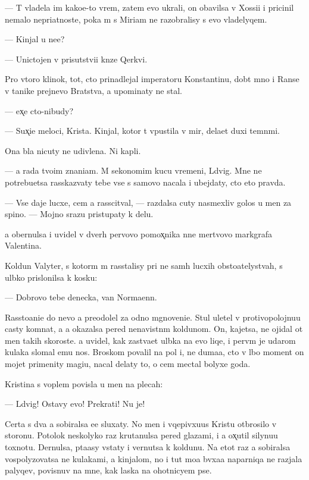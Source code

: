 \documentclass[10pt]{book}
\begin{document}
— T{\yi} vladela im kako{\y}e-to vrem{\ia}, zatem {\y}evo ukrali, on ob{\y}avilsa v Xossi{\y}i i pricinil nemalo nepri{\y}atnoste{\y}, poka m{\yi} s Miriam ne razobralisy s {\y}evo vladelyqem.

— Kinjal u ne{\y}e?

— Unictojen v prisutstvi{\y}i kn{\ia}ze{\y} Qerkvi.

Pro vtoro{\y} klinok, tot, cto prinadlejal imperatoru Konstantinu, dob{\yi}t{\yi}{\y} mno{\y} i Ranse v ta{\y}nike prejnevo Bratstva, {\y}a upominaty ne stal.

— {\Y}ex̨e cto-nibudy?

— Sux̨i{\y}e meloci, Krista. Kinjal, kotor{\yi}{\y} t{\yi} v{\yi}pustila v mir, dela{\y}et duxi temn{\yi}mi.

Ona b{\yi}la nicuty ne udivlena. Ni kapli.

— {\Y}a rada tvo{\y}im znani{\y}am. M{\yi} sekonomim kucu vremeni, L{\iu}dvig. Mne ne potrebu{\y}etsa rasskaz{\yi}vaty tebe vse s samovo nacala i ubejdaty, cto eto pravda.

— Vse daje lucxe, cem {\y}a rasscit{\yi}val, — razdalsa cuty nasmexliv{\yi}{\y} golos u men{\ia} za spino{\y}. — Mojno srazu pristupaty k delu.

{\Y}a obernulsa i uvidel v dver{\ia}h pervovo pomox̨nika n{\yi}ne mertvovo markgrafa Valentina.

Koldun Valyter, s kotor{\yi}m m{\yi} rasstalisy pri ne sam{\yi}h lucxih obsto{\y}atelystvah, s ul{\yi}bko{\y} prislonilsa k kos{\ia}ku:

— Dobrovo tebe denecka, van Norma{\y}enn.

Rassto{\y}ani{\y}e do nevo {\y}a preodolel za odno mgnoveni{\y}e. Stul uletel v protivopolojnu{\y}u casty komnat{\yi}, a {\y}a okazalsa pered nenavistn{\yi}m koldunom. On, kajetsa, ne ojidal ot men{\ia} takih skoroste{\y}. {\Y}a uvidel, kak zast{\yi}va{\y}et ul{\yi}bka na {\y}evo liqe, i perv{\yi}m je udarom kulaka slomal {\y}emu nos. Broskom povalil na pol i, ne duma{\y}a, cto v l{\iu}bo{\y} moment on mojet primenity magi{\y}u, nacal delaty to, o cem mectal bolyxe goda.

Kristina s voplem povisla u men{\ia} na plecah:

— L{\iu}dvig! Ostavy {\y}evo! Prekrati! Nu je!

Certa s dva {\y}a sobiralsa {\y}e{\y}e sluxaty. No men{\ia} i vqepivxu{\y}us{\ia} Kristu otbrosilo v storonu. Potolok neskolyko raz krutanulsa pered glazami, i {\y}a ox̨util silynu{\y}u toxnotu. Dernulsa, p{\yi}ta{\y}asy vstaty i vernutsa k koldunu. Na etot raz {\y}a sobiralsa vospolyzovatsa ne kulakami, a kinjalom, no i tut mo{\y}a b{\yi}vxa{\y}a naparniqa ne razjala palyqev, povisnuv na mne, kak laska na ohotnicyem pse.
\end{document}
